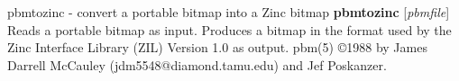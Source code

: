 %

\newpage
%

pbmtozinc - convert a portable bitmap into a Zinc bitmap
{\bf pbmtozinc}
{\rm [}{\it pbmfile}{\rm ]}
Reads a portable bitmap as input.
Produces a bitmap in the format used by the Zinc Interface Library
(ZIL) Version 1.0 as output.
pbm(5)
\copyright 1988 by James Darrell McCauley (jdm5548@diamond.tamu.edu)
and Jef Poskanzer.
%
%
 
%

\newpage
%

